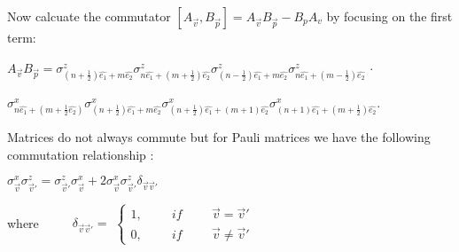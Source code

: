 \documentclass{Configuration_Files/PoliMi3i_thesis}
\begin{document}

	
	

Now calcuate the commutator $[A_{\vec{v}},B_{\vec{p}}] = A_{\vec{v}}B_{\vec{p}} - B_{p}A_{v}$ by focusing on the first term: \newline

\begin{center}
	
	$ A_{\vec{v}}B_{\vec{p}} =
	\sigma^z_{(n+\frac{1}{2})\hat{e_1} + m\hat{e_2}} \sigma^z_{n\hat{e_1}+(m+\frac{1}{2})\hat{e_2}} \sigma^z_{(n-\frac{1}{2})\hat{e_1} + m\hat{e_2}} \sigma^z_{n\hat{e_1}+(m-\frac{1}{2})\hat{e_2}} $ $\cdot$
	
	$\sigma^x_{n\hat{e_1} + (m+\frac{1}{2}\hat{e_2})} \sigma^x_{(n+ \frac{1}{2})\hat{e_1} + m\hat{e_2}} \sigma^x_{(n+ \frac{1}{2})\hat{e_1} + (m + 1)\hat{e_2}} \sigma^x_{(n+ 1)\hat{e_1} + (m + \frac{1}{2})\hat{e_2}}$. \newline
	
\end{center}


Matrices do not always commute but for Pauli matrices we have the following commutation relationship :
\newline

\begin{center}
	$\sigma^x_{\vec{v}}\sigma^z_{\vec{v}'} = \sigma^z_{\vec{v}'} \sigma^x_{\vec{v}} + 2 \sigma^x_{\vec{v}}\sigma^z_{\vec{v}'} \delta_{\vec{v} \vec{v}'}$\newline
\end{center}

where $\hspace{1cm} \delta_{\vec{v} \vec{v}'} =$
$\begin{cases}
	1, \hspace{1cm} if \hspace{1cm}  \vec{v} = \vec{v}'\\
	0, \hspace{1cm} if \hspace{1cm} \vec{v} \neq \vec{v}'
\end{cases}$\newline
\end{document}
